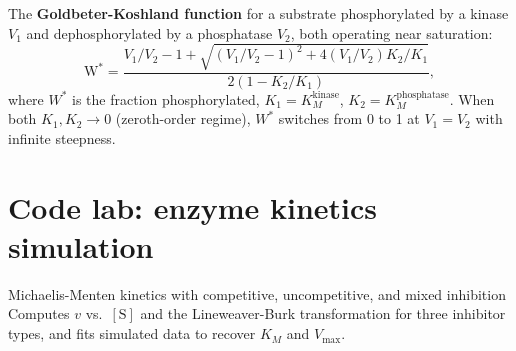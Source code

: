 \documentclass[12pt, a4paper, oneside]{report}
\begin{document}
The \textbf{Goldbeter-Koshland function} for a substrate phosphorylated
by a kinase $V_1$ and dephosphorylated by a phosphatase $V_2$, both
operating near saturation:
\begin{equation}
  \mathrm{W}^\ast = \frac{V_1/V_2 - 1 + \sqrt{(V_1/V_2 - 1)^2 + 4(V_1/V_2)K_2/K_1}}
                         {2(1 - K_2/K_1)},
  \label{eq:gk}
\end{equation}
where $W^\ast$ is the fraction phosphorylated, $K_1 = K_M^\text{kinase}$,
$K_2 = K_M^\text{phosphatase}$. When both $K_1, K_2 \to 0$
(zeroth-order regime), $W^\ast$ switches from 0 to 1 at $V_1 = V_2$
with infinite steepness.

\section{Code lab: enzyme kinetics simulation}

\begin{codelab}{Michaelis-Menten kinetics with competitive, uncompetitive, and mixed inhibition}
  Computes $v$ vs.\ $[\mathrm{S}]$ and the Lineweaver-Burk transformation
  for three inhibitor types, and fits simulated data to recover $K_M$
  and $V_{\max}$.
\end{codelab}
\end{document}
